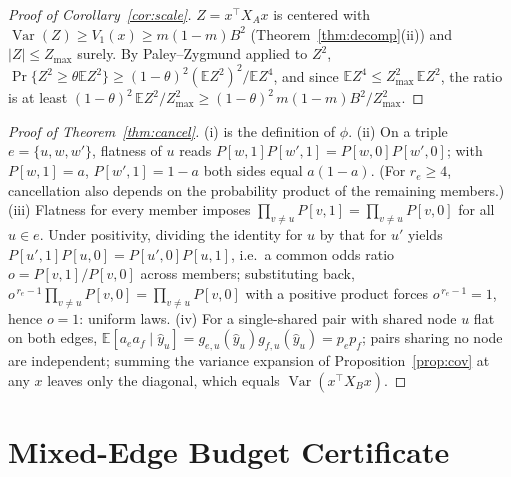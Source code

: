 \documentclass[preprint,11pt]{elsarticle}
\begin{document}
\begin{proof}[Proof of Corollary~\ref{cor:scale}]
$Z=x^\top X_Ax$ is centered with
$\operatorname{Var}(Z)\ge V_1(x)\ge m(1-m)B^2$
(Theorem~\ref{thm:decomp}(ii)) and $|Z|\le Z_{\max}$ surely. By
Paley--Zygmund applied to $Z^2$,
$\Pr\{Z^2\ge\theta\mathbb E Z^2\}\ge(1-\theta)^2(\mathbb EZ^2)^2/
\mathbb EZ^4$, and since $\mathbb E Z^4\le Z_{\max}^2\,\mathbb E Z^2$,
the ratio is at least $(1-\theta)^2\,\mathbb EZ^2/Z_{\max}^2\ge
(1-\theta)^2\,m(1-m)B^2/Z_{\max}^2$.
\end{proof}

\begin{proof}[Proof of Theorem~\ref{thm:cancel}]
(i) is the definition of $\phi$. (ii) On a triple
$e=\{u,w,w'\}$, flatness of $u$ reads
$P[w,1]P[w',1]=P[w,0]P[w',0]$; with $P[w,1]=a$, $P[w',1]=1-a$ both
sides equal $a(1-a)$. (For $r_e\ge4$, cancellation also depends on
the probability product of the remaining members.) (iii) Flatness for
every member imposes
$\prod_{v\ne u}P[v,1]=\prod_{v\ne u}P[v,0]$ for all $u\in e$. Under
positivity, dividing the identity for $u$ by that for $u'$ yields
$P[u',1]P[u,0]=P[u',0]P[u,1]$, i.e.\ a common odds ratio
$o=P[v,1]/P[v,0]$ across members; substituting back,
$o^{\,r_e-1}\prod_{v\ne u}P[v,0]=\prod_{v\ne u}P[v,0]$ with a
positive product forces $o^{\,r_e-1}=1$, hence $o=1$: uniform laws.
(iv) For a single-shared pair with shared node $u$ flat on both
edges, $\mathbb E[a_ea_f\mid\hat y_u]
=g_{e,u}(\hat y_u)g_{f,u}(\hat y_u)=p_ep_f$; pairs sharing no node
are independent; summing the variance
expansion of Proposition~\ref{prop:cov} at any $x$ leaves only
the diagonal, which equals $\operatorname{Var}(x^\top X_Bx)$.
\end{proof}

\section{Mixed-Edge Budget Certificate}\label{app:mixed}
\end{document}
